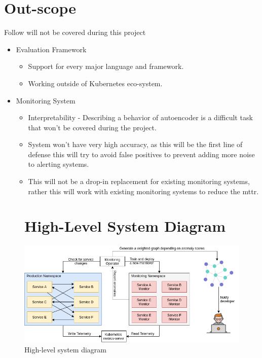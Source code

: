 


\section{Out-scope}
Follow will not be covered during this project
\begin{itemize}
    \item Evaluation Framework
    \begin{itemize}
        \item Support for every major language and framework.
        \item Working outside of Kubernetes eco-system.
    \end{itemize}
    \item Monitoring System
    \begin{itemize}
        \item Interpretability - Describing a behavior of autoencoder is a difficult task that won't be covered during the project.
        \item System won't have very high accuracy, as this will be the first line of defense this will try to avoid false positives to prevent adding more noise to alerting systems.
        \item This will not be a drop-in replacement for existing monitoring systems, rather this will work with existing monitoring systems to reduce the \ac{mttr}.
    \end{itemize}
\end{itemize}

\begin{figure}[!ht]
    \section{High-Level System Diagram}
    \centering
    \includegraphics[width=16cm]{assets/High-level-system-diagram.png}
    \caption{High-level system diagram}
    \label{fig:high-level-diagram}
\end{figure}